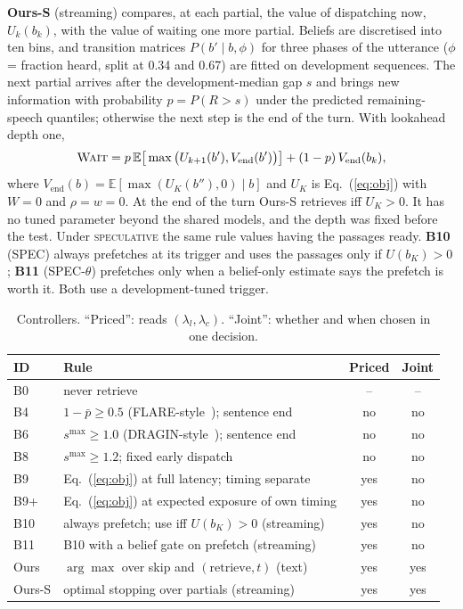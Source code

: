 \textbf{Ours-S} (streaming) compares, at each partial, the value of
dispatching now, $U_k(b_k)$, with the value of waiting one more partial.
Beliefs are discretised into ten bins, and transition matrices
$P(b'\mid b,\phi)$ for three phases of the utterance ($\phi$ = fraction heard,
split at 0.34 and 0.67) are fitted on development sequences. The next partial
arrives after the development-median gap $s$ and brings new information with
probability $p=P(R>s)$ under the predicted remaining-speech quantiles;
otherwise the next step is the end of the turn. With lookahead depth one,
\begin{equation}
\textsc{Wait}=p\,\mathbb E\big[\max\big(U_{k+1}(b'),V_{\mathrm{end}}(b')\big)\big]+(1-p)\,V_{\mathrm{end}}(b_k),
\label{eq:wait}
\end{equation}
where $V_{\mathrm{end}}(b)=\mathbb E[\max(U_K(b''),0)\mid b]$ and $U_K$ is
Eq.~(\ref{eq:obj}) with $W=0$ and $\rho=w=0$. At the end of the turn Ours-S
retrieves iff $U_K>0$. It has no tuned parameter beyond the shared models,
and the depth was fixed before the test. Under \textsc{speculative} the same
rule values having the passages ready. \textbf{B10} (SPEC) always prefetches
at its trigger and uses the passages only if $U(b_K)>0$; \textbf{B11}
(SPEC-$\theta$) prefetches only when a belief-only estimate says the prefetch
is worth it. Both use a development-tuned trigger.

\begin{table}[t]
\caption{Controllers. ``Priced'': reads $(\lambda_l,\lambda_c)$. ``Joint'':
whether and when chosen in one decision.}
\label{tab:controllers}
\centering
\footnotesize
\setlength{\tabcolsep}{3pt}
\begin{tabular}{@{}l p{4.1cm} c c@{}}
\toprule
ID & Rule & Priced & Joint\\
\midrule
B0 & never retrieve & -- & --\\
B4 & $1-\bar p\ge0.5$ (FLARE-style~\cite{jiang2023flare}); sentence end & no & no\\
B6 & $s^{\max}\ge1.0$ (DRAGIN-style~\cite{su2024dragin}); sentence end & no & no\\
B8 & $s^{\max}\ge1.2$; fixed early dispatch & no & no\\
B9 & Eq.~(\ref{eq:obj}) at full latency; timing separate & yes & no\\
B9+ & Eq.~(\ref{eq:obj}) at expected exposure of own timing & yes & no\\
B10 & always prefetch; use iff $U(b_K)>0$ (streaming) & yes & no\\
B11 & B10 with a belief gate on prefetch (streaming) & yes & no\\
Ours & $\arg\max$ over skip and $(\text{retrieve},t)$ (text) & yes & yes\\
Ours-S & optimal stopping over partials (streaming) & yes & yes\\
\bottomrule
\end{tabular}
\end{table}

